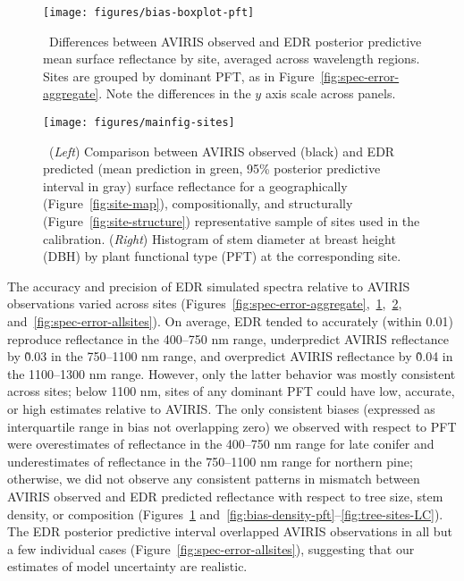 \begin{figure}
  \centering
  \texttt{[image: figures/bias-boxplot-pft]}
  \caption{\label{fig:bias-boxplot-pft}\
    Differences between AVIRIS observed and EDR posterior predictive mean surface reflectance by site, averaged across wavelength regions.
    Sites are grouped by dominant PFT, as in Figure~\ref{fig:spec-error-aggregate}.
    Note the differences in the $y$ axis scale across panels.
  }
\end{figure}

\begin{figure}
  \centering
  \texttt{[image: figures/mainfig-sites]}
  \caption{\label{fig:spec-error-all}\
    (\emph{Left}) Comparison between AVIRIS observed (black) and
    EDR predicted (mean prediction in green, 95\% posterior predictive interval in gray)
    surface reflectance for a geographically (Figure~\ref{fig:site-map}), compositionally, and structurally (Figure~\ref{fig:site-structure}) representative sample of sites used in the calibration.
    (\emph{Right}) Histogram of stem diameter at breast height (DBH) by plant functional type (PFT) at the corresponding site.
  }
\end{figure}

The accuracy and precision of EDR simulated spectra relative to AVIRIS observations varied across sites (Figures~\ref{fig:spec-error-aggregate},~\ref{fig:bias-boxplot-pft},~\ref{fig:spec-error-all}, and~\ref{fig:spec-error-allsites}).
On average, EDR tended to accurately (within 0.01) reproduce reflectance in the 400--750 \unit{nm} range, underpredict AVIRIS reflectance by \~0.03 in the 750--1100 \unit{nm} range, and overpredict AVIRIS reflectance by \~0.04 in the 1100--1300 \unit{nm} range.
However, only the latter behavior was mostly consistent across sites;
below 1100 \unit{nm}, sites of any dominant PFT could have low, accurate, or high estimates relative to AVIRIS.\@
The only consistent biases (expressed as interquartile range in bias not overlapping zero) we observed with respect to PFT were
overestimates of reflectance in the 400--750 \unit{nm} range for late conifer
and
underestimates of reflectance in the 750--1100 \unit{nm} range for northern pine;
otherwise, we did not observe any consistent patterns in mismatch between AVIRIS observed and EDR predicted reflectance with respect to tree size, stem density, or composition (Figures~\ref{fig:bias-boxplot-pft} and~\ref{fig:bias-density-pft}--\ref{fig:tree-sites-LC}).
The EDR posterior predictive interval overlapped AVIRIS observations in all but a few individual cases (Figure~\ref{fig:spec-error-allsites}), suggesting that our estimates of model uncertainty are realistic.

